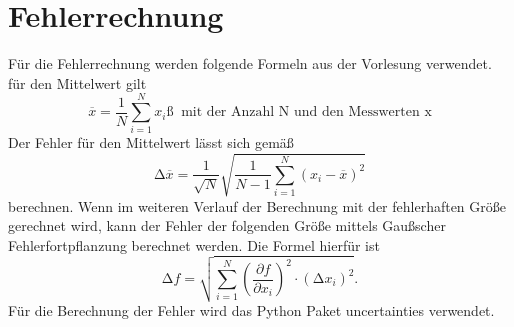 \section{Fehlerrechnung}
\label{sec:Fehlerrechnung}
Für die Fehlerrechnung werden folgende Formeln aus der Vorlesung verwendet.
für den Mittelwert gilt
\begin{equation}
    \overline{x}=\frac{1}{N}\sum_{i=1}^N x_i ß\; \;\text{mit der Anzahl N und den Messwerten x} 
    \label{eqn:Mittelwert}
\end{equation}
Der Fehler für den Mittelwert lässt sich gemäß
\begin{equation}
    \increment \overline{x}=\frac{1}{\sqrt{N}}\sqrt{\frac{1}{N-1}\sum_{i=1}^N(x_i-\overline{x})^2}
    \label{eqn:FehlerMittelwert}
\end{equation}
berechnen.
Wenn im weiteren Verlauf der Berechnung mit der fehlerhaften Größe gerechnet wird, kann der Fehler der folgenden Größe
mittels Gaußscher Fehlerfortpflanzung berechnet werden. Die Formel hierfür ist
\begin{equation}
    \increment f= \sqrt{\sum_{i=1}^N\left(\frac{\partial f}{\partial x_i}\right)^2\cdot(\increment x_i)^2}.
    \label{eqn:GaussMittelwert}
\end{equation}
Für die Berechnung der Fehler wird das Python Paket uncertainties verwendet.
